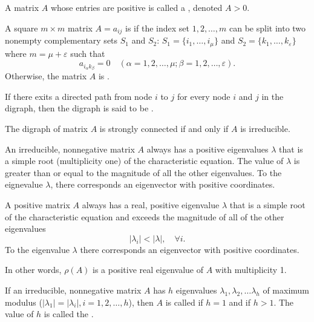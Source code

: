 \begin{definition}
A matrix $A$ whose entries are positive is called a , denoted $A> 0$.
\end{definition}


\begin{definition}
A square $m\times m$  matrix $A=a_{ij}$ is  if the index set $1,2, \dots, m$ can be split into two nonempty complementary sets $S_1$ and $S_2$: $S_1=\{i_1,\dots , i_{\mu}\}$ and $S_2=\{k_1,\dots , k_{\varepsilon}\}$ where $m=\mu+\varepsilon$ such that
$$a_{i_\alpha k_{\beta}}=0 \quad (\alpha = 1,2,\dots , \mu; \beta = 1,2, \dots, \varepsilon).$$
Otherwise, the matrix $A$ is .
\end{definition}


\begin{definition}
If there exits a directed path from node $i$ to $j$ for every node $i$ and $j$ in the digraph, then the digraph is said to be .
\end{definition}

\begin{theorem}
The digraph of matrix $A$ is strongly connected if and only if $A$ is irreducible.
\end{theorem}


\begin{theorem}
An irreducible, nonnegative matrix $A$ always has a positive eigenvalues $\lambda$ that is a simple root (multiplicity one) of the characteristic equation. The value of $\lambda$ is greater than or equal to the magnitude of all the other eigenvalues. To the eignevalue $\lambda$, there corresponds an eigenvector with positive coordinates.
\end{theorem}


\begin{theorem}
A positive matrix $A$ always has a real, positive eigenvalue $\lambda$ that is a simple root of the characteristic equation and exceeds the magnitude of all of the other eigenvalues
$$|\lambda _i|<|\lambda|,\quad \forall i.$$
To the eigenvalue $\lambda$ there corresponds an eigenvector with positive coordinates.
\end{theorem}
In other words, $\rho(A)$ is a positive real eigenvalue of $A$ with multiplicity 1.

\begin{definition}[Primitivity]
If an irreducible, nonnegative matrix $A$ has $h$ eigenvalues $\lambda _1, \lambda _2, \dots \lambda _h$ of maximum modulus ($|\lambda _1 |= |\lambda _i|, i=1,2,\dots ,h $), then $A$ is called  if $h=1$ and  if $h>1$. The value of $h$ is called the .
\end{definition}

